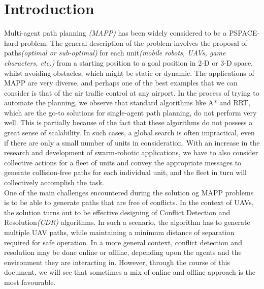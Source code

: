 


\maketitle
\nocite{*}
\section{Introduction}
Multi-agent path planning \textit{(MAPP)} has been widely considered to be a PSPACE-hard problem. The general description of the problem involves the proposal of paths\textit{(optimal or sub-optimal)} for each unit\textit{(mobile robots, UAVs, game characters, etc.)} from a starting position to a goal position in 2-D or 3-D space, whilst avoiding obstacles, which might be static or dynamic. The applications of MAPP are very diverse, and perhaps one of the best examples that we can consider is that of the air traffic control at any airport. In the process of trying to automate the planning, we observe that standard algorithms like A* and RRT, which are the go-to solutions for single-agent path planning, do not perform very well. This is partially because of the fact that these algorithms do not possess a great sense of scalability. In such cases, a global search is often impractical, even if there are only a small number of units in consideration. With an increase in the research and development of swarm-robotic applications, we have to also consider collective actions for a fleet of units and convey the appropriate messages to generate collision-free paths for each individual unit, and the fleet in turn will collectively accomplish the task.\\

One of the main challenges encountered during the solution og MAPP problems is to be able to generate paths that are free of conflicts. In the context of UAVs, the solution turns out to be effective designing of Conflict Detection and Resolution\textit{(CDR)} algorithms. In such a scenario, the algorithm has to generate multiple UAV paths, while maintaining a minimum distance of separation required for safe operation. In a more general context, conflict detection and resolution may be done online or offline, depending upon the agents and the environment they are interacting in. However, through the course of this document, we will see that sometimes a mix of online and offline approach is the most favourable.\\

